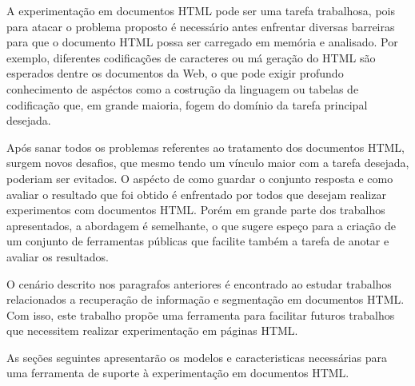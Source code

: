 \documentclass{acm_proc_article-sp}
\numberwithin{equation}{section}
\begin{document}

A experimentação em documentos HTML pode ser uma tarefa trabalhosa, pois
para atacar o problema proposto é necessário antes enfrentar diversas
barreiras para que o documento HTML possa ser carregado em memória e
analisado. Por exemplo, diferentes codificações de caracteres ou má geração do
HTML são esperados dentre os documentos da Web, o que pode 
exigir profundo conhecimento de aspéctos como a costrução da linguagem ou
tabelas de codificação que, em grande maioria, fogem do domínio da tarefa
principal desejada.



Após sanar todos os problemas referentes ao tratamento dos documentos
HTML, surgem novos desafios, que mesmo tendo um vínculo maior com a tarefa
desejada, poderiam ser evitados. O aspécto de como guardar o conjunto
resposta e como avaliar o resultado que foi obtido é enfrentado por
todos que desejam realizar experimentos com documentos HTML. Porém em
grande parte dos trabalhos apresentados, a abordagem é semelhante, o que
sugere espeço para a criação de um conjunto de ferramentas públicas que
facilite também a tarefa de anotar e avaliar os resultados.

O cenário descrito nos paragrafos anteriores é encontrado ao estudar trabalhos
relacionados a recuperação de informação e segmentação em documentos
HTML. Com isso, este trabalho propõe uma ferramenta para
facilitar futuros trabalhos que necessitem realizar experimentação em páginas
HTML.

As seções seguintes apresentarão os modelos e caracteristicas
necessárias para uma ferramenta de suporte à experimentação em
documentos HTML.
\end{document}
